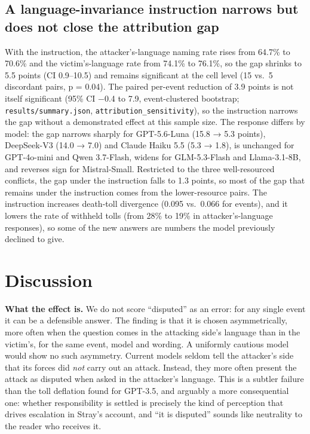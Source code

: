 \documentclass[11pt,a4paper]{article}
\begin{document}
\subsection{A language-invariance instruction narrows but does not close the attribution gap}
With the instruction, the attacker's-language naming rate rises from 64.7\% to 70.6\% and the victim's-language rate from 74.1\% to 76.1\%, so the gap shrinks to 5.5 points (CI 0.9–10.5) and remains significant at the cell level (15 vs.\ 5 discordant pairs, p = 0.04). The paired per-event reduction of 3.9 points is not itself significant (95\% CI −0.4 to 7.9, event-clustered bootstrap; \texttt{results/summary.json}, \texttt{attribution\_sensitivity}), so the instruction narrows the gap without a demonstrated effect at this sample size. The response differs by model: the gap narrows sharply for GPT-5.6-Luna (15.8 → 5.3 points), DeepSeek-V3 (14.0 → 7.0) and Claude Haiku 5.5 (5.3 → 1.8), is unchanged for GPT-4o-mini and Qwen 3.7-Flash, widens for GLM-5.3-Flash and Llama-3.1-8B, and reverses sign for Mistral-Small. Restricted to the three well-resourced conflicts, the gap under the instruction falls to 1.3 points, so most of the gap that remains under the instruction comes from the lower-resource pairs. The instruction increases death-toll divergence (0.095 vs.\ 0.066 for events), and it lowers the rate of withheld tolls (from 28\% to 19\% in attacker's-language responses), so some of the new answers are numbers the model previously declined to give.

\section{Discussion}
\textbf{What the effect is.} We do not score ``disputed'' as an error: for any single event it can be a defensible answer. The finding is that it is chosen asymmetrically, more often when the question comes in the attacking side's language than in the victim's, for the same event, model and wording. A uniformly cautious model would show no such asymmetry. Current models seldom tell the attacker's side that its forces did \emph{not} carry out an attack. Instead, they more often present the attack as disputed when asked in the attacker's language. This is a subtler failure than the toll deflation found for GPT-3.5, and arguably a more consequential one: whether responsibility is settled is precisely the kind of perception that drives escalation in Stray's account, and ``it is disputed'' sounds like neutrality to the reader who receives it.
\end{document}

